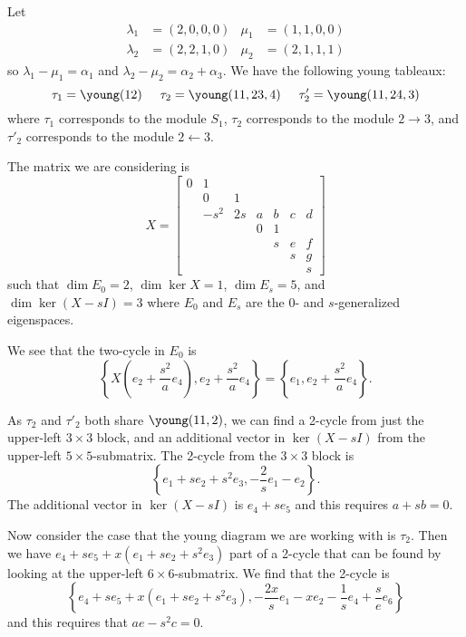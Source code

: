 \documentclass{article}
\begin{document}
\begin{example}[Roger]
Let
    \[
    \begin{aligned}
        \lambda_1 &= (2,0,0,0) & \mu_1 &= (1,1,0,0) \\
        \lambda_2 &= (2,2,1,0) & \mu_2 &= (2,1,1,1)
    \end{aligned}
    \]
so $\lambda_1 - \mu_1 = \alpha_1$ and $\lambda_2 - \mu_2 = \alpha_2 + \alpha_3$. We have the following young tableaux:
\[
\tau_1 = \young(12) \hspace{5mm}
\tau_2 = \young(11,23,4) \hspace{5mm}
\tau_2' = \young(11,24,3)
\]
where $\tau_1$ corresponds to the module $S_1$, $\tau_2$ corresponds to the module $2\rightarrow 3$, and $\tau'_2$ corresponds to the module $2 \leftarrow 3$.

The matrix we are considering is 
\[
X = \begin{bmatrix}
    0 & 1 \\
     & 0 & 1 \\
     & -s^2 & 2s & a & b & c & d \\
     & & & 0 & 1 \\
     & & & & s & e & f \\
     & & & & & s & g \\
     & & & & & & s
\end{bmatrix}
\]
such that $\dim E_0 = 2$, $\dim \ker X = 1$, $\dim E_s = 5$, and $\dim \ker (X-sI) = 3$ where $E_0$ and $E_s$ are the $0$- and $s$-generalized eigenspaces.

We see that the two-cycle in $E_0$ is 
\[
\left\{ X\left(e_2 + \frac{s^2}{a}e_4\right), e_2 + \frac{s^2}{a}e_4 \right\}
= \left\{e_1, e_2 + \frac{s^2}{a}e_4 \right\}.
\]

As $\tau_2$ and $\tau'_2$ both share $\young(11,2)$, we can find a 2-cycle from just the upper-left $3\times3$ block, and an additional vector in $\ker(X-sI)$ from the upper-left $5\times5$-submatrix. The 2-cycle from the $3 \times 3$ block is
\[
\left\{e_1 + se_2 + s^2e_3, -\frac{2}{s}e_1 - e_2 \right\}.
\]
The additional vector in $\ker(X-sI)$ is $e_4 + se_5$ and this requires $a+sb=0$.

Now consider the case that the young diagram we are working with is $\tau_2$. Then we have $e_4 + se_5 + x(e_1 + se_2 + s^2e_3)$ part of a 2-cycle that can be found by looking at the upper-left $6 \times 6$-submatrix. We find that the 2-cycle is
\[
\left\{e_4 + se_5 + x(e_1 + se_2 + s^2e_3), -\frac{2x}{s}e_1 -xe_2 -\frac{1}{s}e_4 + \frac{s}{e}e_6 \right\}
\]
and this requires that $ae - s^2c = 0$.


\end{example}
\end{document}
